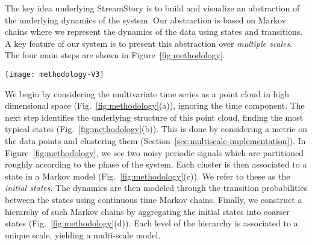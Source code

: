 
The key idea underlying StreamStory is to build and visualize an abstraction of the underlying 
dynamics of the system. Our abstraction is based on Markov chains where we represent the dynamics of the data using states and transitions. A key feature of our system is to present this abstraction over \emph{multiple scales}. 
%
%
The four main steps are shown in Figure~\ref{fig:methodology}.
\begin{figure*}[]
	\centering
	\texttt{[image: methodology-V3]}
	\caption{Overview of the proposed pipeline. (a) We first represent the multivariate time series as a point cloud, where each point in time, the values of the multiple time series are used as coordinates. To illustrate, we show two noisy approximately periodic signals. (b) We extract the typical states of the system, partitioning the space. Here clustering partitions the space into intervals which correspond to the sections of the phase of the signal. (c) This partition is then translated into a Markov chain model, with each state representing a partition cell. (d) The Markov chain model is simplified by aggregating states, giving a multiscale view of the system.   }
	\label{fig:methodology}
\end{figure*}
%
We begin by considering the multivariate time series as a point cloud in high dimensional space (Fig.~\ref{fig:methodology}(a)), ignoring the time component. The next step identifies the underlying structure of this point cloud, finding the most typical states (Fig.~\ref{fig:methodology}(b)). This is done by considering a metric on the data points and clustering them (Section~\ref{sec:multiscale-implementation}). In Figure~\ref{fig:methodology}, we see two noisy periodic signals which are partitioned roughly according to the phase of the system. 
Each cluster is then associated to a state in a Markov model (Fig.~\ref{fig:methodology}(c)). We refer to these as the \emph{initial states}. 
The dynamics are then modeled through the transition probabilities between the states using continuous time Markov chains. Finally, we construct a hierarchy of such Markov chains by aggregating the initial states into coarser states (Fig.~\ref{fig:methodology}(d)). Each level of the hierarchy is associated to a unique scale, yielding a multi-scale model.

